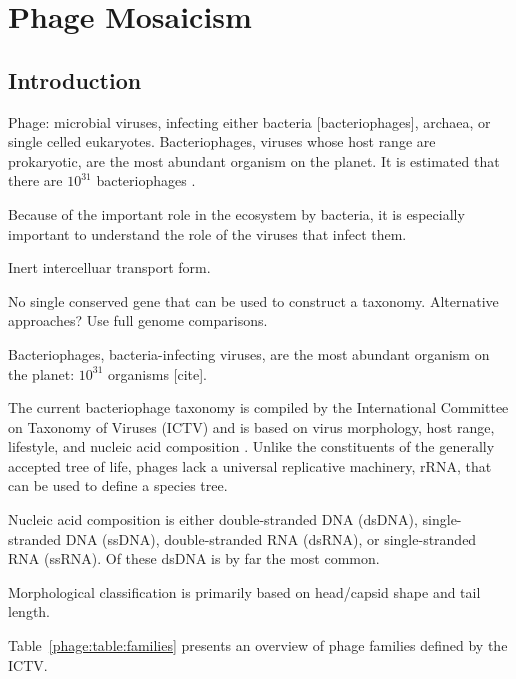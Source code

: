 \chapter{Phage Mosaicism}
\label{ch:phage}

\section{Introduction}
\label{phage:sec:introduction}

Phage: microbial viruses, infecting either bacteria [bacteriophages], archaea, or single celled eukaryotes.
Bacteriophages, viruses whose host range are prokaryotic, are the most abundant organism on the planet.
It is estimated that there are $10^31$ bacteriophages \cite{Rohwer:2014vz}.

Because of the important role in the ecosystem by bacteria, it is especially important to understand the role of the viruses that infect them.

Inert intercelluar transport form.

No single conserved gene that can be used to construct a taxonomy.
Alternative approaches?
Use full genome comparisons.

Bacteriophages, bacteria-infecting viruses, are the most abundant organism on the planet: $10^31$ organisms [cite].

The current bacteriophage taxonomy is compiled by the International Committee on Taxonomy of Viruses (ICTV) and is based on virus morphology, host range, lifestyle, and nucleic acid composition \cite{ICTV:2012}.
Unlike the constituents of the generally accepted tree of life, phages lack a universal replicative machinery, rRNA, that can be used to define a species tree.

Nucleic acid composition is either double-stranded DNA (dsDNA), single-stranded DNA (ssDNA), double-stranded RNA (dsRNA), or single-stranded RNA (ssRNA).
Of these dsDNA is by far the most common.

Morphological classification is primarily based on head/capsid shape and tail length.

Table~\ref{phage:table:families} presents an overview of phage families defined by the ICTV.

